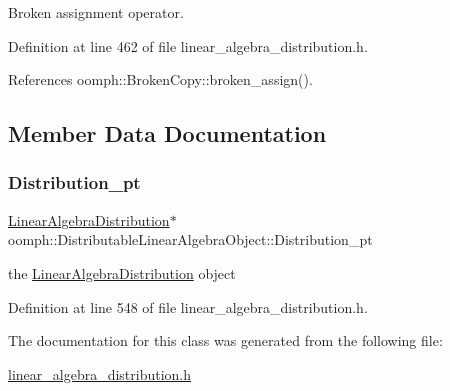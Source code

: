Broken assignment operator. 



Definition at line 462 of file linear\+\_\+algebra\+\_\+distribution.\+h.



References oomph\+::\+Broken\+Copy\+::broken\+\_\+assign().



\subsection{Member Data Documentation}
\mbox{\label{classoomph_1_1DistributableLinearAlgebraObject_a94280ec477823427098dc46b20e29f5a}} 
\subsubsection{\texorpdfstring{Distribution\+\_\+pt}{Distribution\_pt}}
{\footnotesize\ttfamily \hyperlink{classoomph_1_1LinearAlgebraDistribution}{Linear\+Algebra\+Distribution}$\ast$ oomph\+::\+Distributable\+Linear\+Algebra\+Object\+::\+Distribution\+\_\+pt\hspace{0.3cm}{\ttfamily [private]}}



the \hyperlink{classoomph_1_1LinearAlgebraDistribution}{Linear\+Algebra\+Distribution} object 



Definition at line 548 of file linear\+\_\+algebra\+\_\+distribution.\+h.



The documentation for this class was generated from the following file\+:\begin{DoxyCompactItemize}
\item 
\hyperlink{linear__algebra__distribution_8h}{linear\+\_\+algebra\+\_\+distribution.\+h}\end{DoxyCompactItemize}
